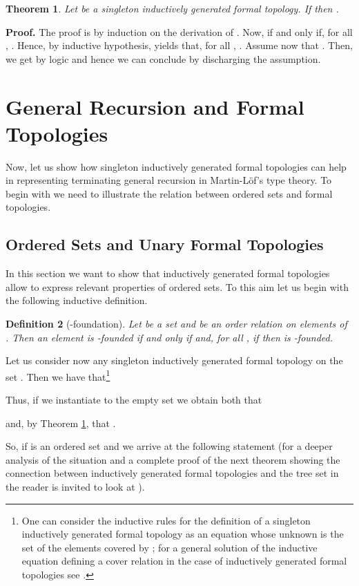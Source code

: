 \documentclass[copyright,creativecommons]{eptcs}
\newtheorem{definition}{Definition}[section]
\newtheorem{theorem}[definition]{Theorem}
\begin{document}
\begin{theorem}
\label{thSingleForm}
Let  be a singleton inductively generated formal topology.
If  then .
\end{theorem}
{\bf Proof.}
The proof is by induction on the derivation of .
Now,  if and only if, for all , .
Hence, by inductive hypothesis,  yields that, for all , 
.
Assume now that .
Then, we get  by logic and hence we can conclude  by 
discharging the assumption.


\section{General Recursion and Formal Topologies}

Now, let us show how singleton inductively generated formal topologies can help in representing
terminating general recursion in Martin-L\"of's type theory.
To begin with we need to illustrate the relation between ordered sets and formal topologies.

\subsection{Ordered Sets and Unary Formal Topologies}
\label{ipergioco}

In this section we want to show that inductively generated formal topologies allow to express relevant
properties of ordered sets.
To this aim let us begin with the following inductive definition.

\begin{definition}[-foundation]
Let  be a set and  be an order relation on elements of .
Then an element  is {\em -founded} if and only if  and, for all , 
if  then  is {\em -founded}.
\end{definition}

Let us consider now any singleton inductively generated formal topology  on the set .
Then we have that\footnote{One can consider the inductive rules for the definition of a singleton 
inductively generated formal topology as an equation whose unknown is the set of the
elements covered by ; for a general solution of the inductive equation defining a cover relation 
in the case of inductively generated formal topologies see \cite{Val07}.}


Thus, if we instantiate  to the empty set we obtain both that

and, by Theorem \ref{thSingleForm}, that .

So, if  is an ordered set and  we arrive at 
the following statement (for a deeper analysis of the situation and a complete proof of
the next theorem showing the connection between inductively generated formal topologies
and the tree set in \cite{NPS90} the reader is invited to look at \cite{Val07,Val10}).
\end{document}

